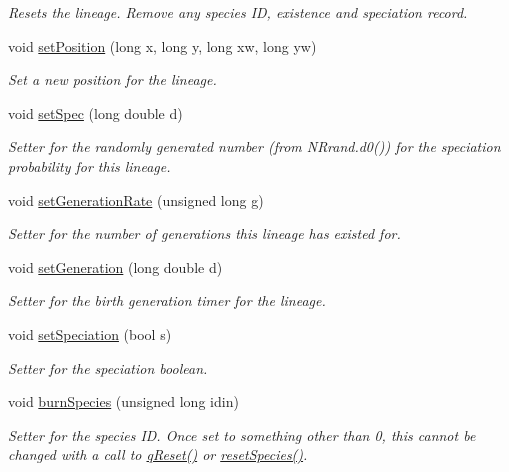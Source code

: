 \begin{DoxyCompactItemize}
\begin{DoxyCompactList}\small\item\em Resets the lineage. Remove any species ID, existence and speciation record. \end{DoxyCompactList}\item 
void \hyperlink{class_tree_node_a123ebe5ac7a4aa9c911aed404b22f166}{set\+Position} (long x, long y, long xw, long yw)
\begin{DoxyCompactList}\small\item\em Set a new position for the lineage. \end{DoxyCompactList}\item 
void \hyperlink{class_tree_node_ac5b41ed58cd5270504d4891af28a3a52}{set\+Spec} (long double d)
\begin{DoxyCompactList}\small\item\em Setter for the randomly generated number (from N\+Rrand.\+d0()) for the speciation probability for this lineage. \end{DoxyCompactList}\item 
void \hyperlink{class_tree_node_a114820b41e7d84a5761573784acc1d5e}{set\+Generation\+Rate} (unsigned long g)
\begin{DoxyCompactList}\small\item\em Setter for the number of generations this lineage has existed for. \end{DoxyCompactList}\item 
void \hyperlink{class_tree_node_ab51e108eac10b3f9e3fdd1e42882a94c}{set\+Generation} (long double d)
\begin{DoxyCompactList}\small\item\em Setter for the birth generation timer for the lineage. \end{DoxyCompactList}\item 
void \hyperlink{class_tree_node_a7b0ead212f130b9754be7f1cb6eda13e}{set\+Speciation} (bool s)
\begin{DoxyCompactList}\small\item\em Setter for the speciation boolean. \end{DoxyCompactList}\item 
void \hyperlink{class_tree_node_a99516661c1321a1b4948be29ed247936}{burn\+Species} (unsigned long idin)
\begin{DoxyCompactList}\small\item\em Setter for the species ID. Once set to something other than 0, this cannot be changed with a call to \hyperlink{class_tree_node_a78b82146ccdd88a405c701c1389c67e2}{q\+Reset()} or \hyperlink{class_tree_node_a715869c786bb0442d56994de11571605}{reset\+Species()}. \end{DoxyCompactList}\item 

\end{DoxyCompactItemize}
